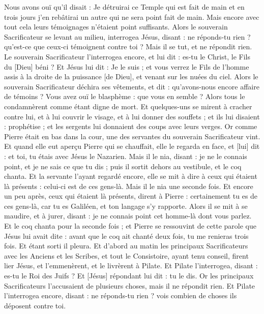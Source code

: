 \begin{multicols}{2}
Nous avons ouï qu'il disait : Je détruirai ce Temple qui est fait de main et en trois jours j'en rebâtirai un autre qui ne sera point fait de main.
Mais encore avec tout cela leurs témoignages n'étaient point suffisants.
Alors le souverain Sacrificateur se levant au milieu, interrogea Jésus, disant : ne réponds-tu rien ? qu'est-ce que ceux-ci témoignent contre toi ?
Mais il se tut, et ne répondit rien. Le souverain Sacrificateur l'interrogea encore, et lui dit : es-tu le Christ, le Fils du [Dieu] béni ?
Et Jésus lui dit : Je le suis ; et vous verrez le Fils de l'homme assis à la droite de la puissance [de Dieu], et venant sur les nuées du ciel.
Alors le souverain Sacrificateur déchira ses vêtements, et dit : qu'avons-nous encore affaire de témoins ?
Vous avez ouï le blasphème : que vous en semble ? Alors tous le condamnèrent comme étant digne de mort.
Et quelques-uns se mirent à cracher contre lui, et à lui couvrir le visage, et à lui donner des souffets ; et ils lui disaient : prophétise ; et les sergents lui donnaient des coups avec leurs verges.
Or comme Pierre était en bas dans la cour, une des servantes du souverain Sacrificateur vint.
Et quand elle eut aperçu Pierre qui se chauffait, elle le regarda en face, et [lui] dit : et toi, tu étais avec Jésus le Nazarien.
Mais il le nia, disant : je ne le connais point, et je ne sais ce que tu dis ; puis il sortit dehors au vestibule, et le coq chanta.
Et la servante l'ayant regardé encore, elle se mit à dire à ceux qui étaient là présents : celui-ci est de ces gens-là.
Mais il le nia une seconde fois. Et encore un peu après, ceux qui étaient là présents, dirent à Pierre : certainement tu es de ces gens-là, car tu es Galiléen, et ton langage s'y rapporte.
Alors il se mit à se maudire, et à jurer, disant : je ne connais point cet homme-là dont vous parlez.
Et le coq chanta pour la seconde fois ; et Pierre se ressouvint de cette parole que Jésus lui avait dite : avant que le coq ait chanté deux fois, tu me renieras trois fois. Et étant sorti il pleura.
\VerseOne{}Et d'abord au matin les principaux Sacrificateurs avec les Anciens et les Scribes, et tout le Consistoire, ayant tenu conseil, firent lier Jésus, et l'emmenèrent, et le livrèrent à Pilate.
Et Pilate l'interrogea, disant : es-tu le Roi des Juifs ? Et [Jésus] répondant lui dit : tu le dis.
Or les principaux Sacrificateurs l'accusaient de plusieurs choses, mais il ne répondit rien.
Et Pilate l'interrogea encore, disant : ne réponds-tu rien ? vois combien de choses ils déposent contre toi.

\end{multicols}
